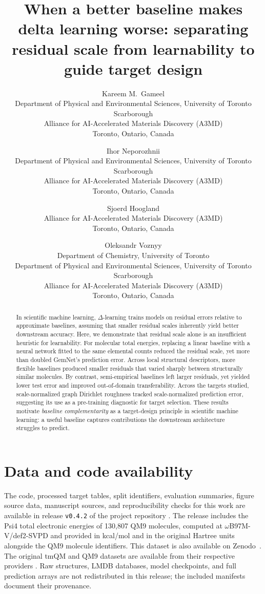 \documentclass[11pt]{article}
\title{When a better baseline makes delta learning worse: separating residual scale from learnability to guide target design}
\author{
  \orcidlink{0000-0002-1168-9830}\hspace{1mm}Kareem M.~Gameel\\
  Department of Physical and Environmental Sciences, University of Toronto Scarborough\\
  Alliance for AI-Accelerated Materials Discovery (A3MD)\\
  Toronto, Ontario, Canada
  \and
  \orcidlink{0000-0001-9906-8010}\hspace{1mm}Ihor Neporozhnii\\
  Department of Physical and Environmental Sciences, University of Toronto Scarborough\\
  Alliance for AI-Accelerated Materials Discovery (A3MD)\\
  Toronto, Ontario, Canada
  \and
  \orcidlink{0000-0002-3099-585X}\hspace{1mm}Sjoerd Hoogland\\
  Alliance for AI-Accelerated Materials Discovery (A3MD)\\
  Toronto, Ontario, Canada
  \and
  \orcidlink{0000-0002-8656-5074}\hspace{1mm}Oleksandr Voznyy\\
  Department of Chemistry, University of Toronto\\
  Department of Physical and Environmental Sciences, University of Toronto Scarborough\\
  Alliance for AI-Accelerated Materials Discovery (A3MD)\\
  Toronto, Ontario, Canada
}
\date{}
\begin{document}
\maketitle

\begin{abstract}
In scientific machine learning, $\Delta$-learning trains models on residual errors relative to approximate baselines, assuming that smaller residual scales inherently yield better downstream accuracy. Here, we demonstrate that residual scale alone is an insufficient heuristic for learnability. For molecular total energies, replacing a linear baseline with a neural network fitted to the same elemental counts reduced the residual scale, yet more than doubled GemNet’s prediction error. Across local structural descriptors, more flexible baselines produced smaller residuals that varied sharply between structurally similar molecules. By contrast, semi-empirical baselines left larger residuals, yet yielded lower test error and improved out-of-domain transferability. Across the targets studied, scale-normalized graph Dirichlet roughness tracked scale-normalized prediction error, suggesting its use as a pre-training diagnostic for target selection. These results motivate \emph{baseline complementarity} as a target-design principle in scientific machine learning: a useful baseline captures contributions the downstream architecture struggles to predict.
\end{abstract}







\section*{Data and code availability}
The code, processed target tables, split identifiers, evaluation summaries, figure source data, manuscript sources, and reproducibility checks for this work are available in release \texttt{v0.4.2} of the project repository \cite{gameel2026correctedRelease}. The release includes the Psi4 total electronic energies of 130,807 QM9 molecules, computed at \(\omega\)B97M-V/def2-SVPD and provided in kcal/mol and in the original Hartree units alongside the QM9 molecule identifiers. This dataset is also available on Zenodo~\cite{gameelQM9Psi4Dataset}. The original tmQM and QM9 datasets are available from their respective providers \cite{balcells2020tmqm,ramakrishnan2014quantum}. Raw structures, LMDB databases, model checkpoints, and full prediction arrays are not redistributed in this release; the included manifests document their provenance.
\end{document}
